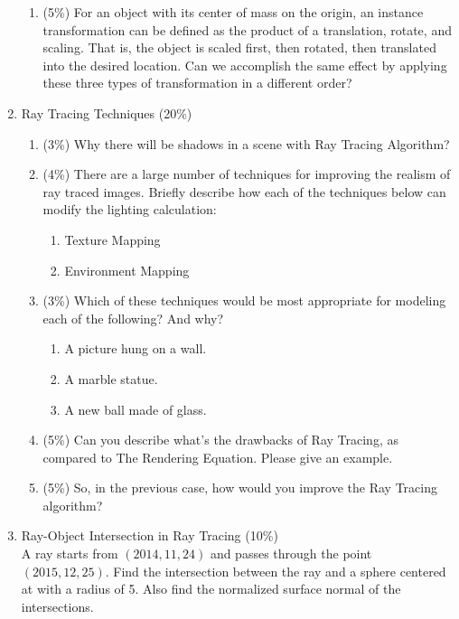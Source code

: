 \documentclass[fleqn]{article}
\begin{document}
\begin{enumerate}
\begin{enumerate}
         \item (5\%) For an object with its center of mass on the origin, an instance transformation can be defined as the product of a translation, rotate, and scaling. That is, the object is scaled first, then rotated, then translated into the desired location. Can we accomplish the same effect by applying these three types of transformation in a different order?
      \end{enumerate}
   \item Ray Tracing Techniques (20\%) \\
      \begin{enumerate}
         \item (3\%) Why there will be shadows in a scene with Ray Tracing Algorithm?
         \item (4\%) There are a large number of techniques for improving the realism of ray traced images. Briefly describe how each of the techniques below can modify the lighting calculation:
            \begin{enumerate}
               \item Texture Mapping
               \item Environment Mapping
            \end{enumerate}
         \item (3\%) Which of these techniques would be most appropriate for modeling each of the following? And why?
            \begin{enumerate}
               \item A picture hung on a wall.
               \item A marble statue.
               \item A new ball made of glass.
            \end{enumerate}
         \item (5\%) Can you describe what’s the drawbacks of Ray Tracing, as compared to The Rendering Equation. Please give an example.
         \item (5\%) So, in the previous case, how would you improve the Ray Tracing algorithm?
      \end{enumerate}
   \newpage
   \item Ray-Object Intersection in Ray Tracing (10\%) \\
      A ray starts from $(2014, 11, 24)$ and passes through the point $(2015,12,25)$. Find the intersection between the ray and a sphere centered at with a radius of 5. Also find the normalized surface normal of the intersections.

\end{enumerate}
\end{document}
